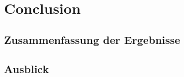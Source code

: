 
%
%
% 
% 
% 

\section{Conclusion}
\label{sec:conclusion}
\subsection{Zusammenfassung der Ergebnisse}
\label{subsec:zusammenfassung}
\subsection{Ausblick}
\label{subsec:ausblick}
